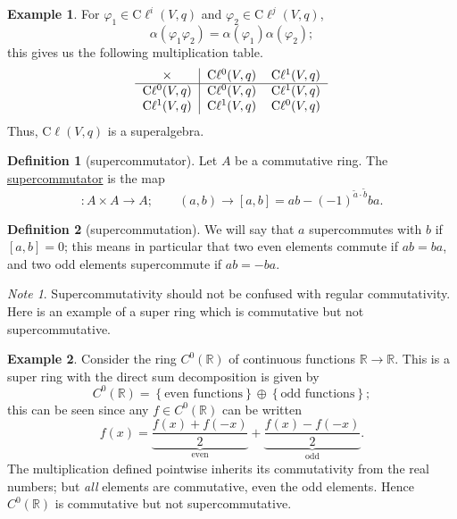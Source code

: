 \documentclass[a4paper,10pt]{scrreprt}
\newcommand{\R}{\mathbb{R}}
\newcommand{\defn}[1]{\ul{#1}}
\newcommand{\cliff}{\mathrm{C}\ell}
\theoremstyle{definition}
\newtheorem{definition}{Definition}[section]
\newtheorem{example}{Example}[section]
\theoremstyle{plain}
\theoremstyle{remark}
\newtheorem{note}{Note}[section]
\begin{document}
\begin{example}
  For $\varphi_{1} \in \cliff^{i}(V,q)$ and $\varphi_{2} \in \cliff^{j}(V,q)$,
  \begin{equation*}
    \alpha(\varphi_{1}\varphi_{2}) = \alpha(\varphi_{1})\alpha(\varphi_{2});
  \end{equation*}
  this gives us the following multiplication table.
  \begin{equation*}
    \begin{tabular}[c]{c | c c}
      $\times$ & $\cliff^{0}(V,q)$ & $\cliff^{1}(V,q)$ \\
      \hline
      $\cliff^{0}(V,q)$ & $\cliff^{0}(V,q)$ & $\cliff^{1}(V,q)$\\
      $\cliff^{1}(V,q)$ & $\cliff^{1}(V,q)$ & $\cliff^{0}(V,q)$\\
    \end{tabular}
  \end{equation*}
  Thus, $\cliff(V,q)$ is a superalgebra.

\end{example}

\begin{definition}[supercommutator]
  \label{def:supercommutator}
  Let $A$ be a commutative ring. The \defn{supercommutator} is the map
  \begin{equation*}
    [\cdot ,\cdot ]\colon A \times A \to A;\qquad (a,b) \to [a,b] = ab - (-1)^{\tilde{a}\cdot \tilde{b}} ba.
  \end{equation*}
\end{definition}

\begin{definition}[supercommutation]
  \label{def:supercommutes}
  We will say that $a$ supercommutes with $b$ if $[a,b] = 0$; this means in particular that two even elements commute if $ab = ba$, and two odd elements supercommute if $ab = -ba$.
\end{definition}
\begin{note}
  Supercommutativity should not be confused with regular commutativity. Here is an example of a super ring which is commutative but not supercommutative.
\end{note}
\begin{example}
  Consider the ring $C^{0}(\R)$ of continuous functions $\R \to \R$. This is a super ring with the direct sum decomposition is given by
  \begin{equation*}
    C^{0}(\R) = \left\{ \text{even functions} \right\} \oplus \left\{ \text{odd functions} \right\};
  \end{equation*}
  this can be seen since any $f \in C^{0}(\R)$ can be written
  \begin{equation*}
    f(x) = \underbrace{\frac{f(x) + f(-x)}{2}}_{\text{even}} + \underbrace{\frac{f(x) - f(-x)}{2}}_{\text{odd}}.
  \end{equation*}
  The multiplication defined pointwise inherits its commutativity from the real numbers; but \emph{all} elements are commutative, even the odd elements. Hence $C^{0}(\R)$ is commutative but not supercommutative.
\end{example}
\end{document}
